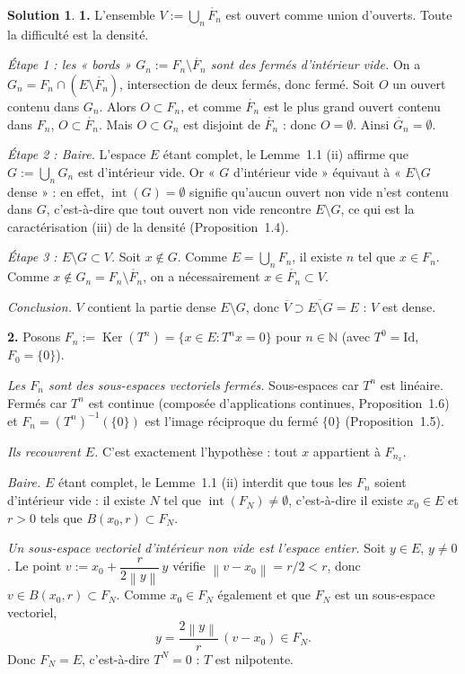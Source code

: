 \documentclass[11pt,a4paper]{article}
\newcommand{\N}{\mathbb{N}}
\newcommand{\interieur}[1]{\mathring{#1}}
\newcommand{\adh}[1]{\overline{#1}}
\newcommand{\Int}{\operatorname{int}}
\newcommand{\norm}[1]{\left\|#1\right\|}
\DeclareMathOperator{\Ker}{Ker}
\newcommand{\ie}{c'est-à-dire}
\theoremstyle{definition}
\newtheorem*{solution}{Solution}
\begin{document}
\begin{solution}
\noindent\textbf{1.} L'ensemble $V:=\bigcup_n\interieur{F_n}$ est ouvert comme union d'ouverts. Toute la difficulté est la densité.

\emph{Étape 1 : les « bords » $G_n:=F_n\setminus\interieur{F_n}$ sont des fermés d'intérieur vide.} On a $G_n=F_n\cap(E\setminus\interieur{F_n})$, intersection de deux fermés, donc fermé. Soit $O$ un ouvert contenu dans $G_n$. Alors $O\subset F_n$, et comme $\interieur{F_n}$ est le plus grand ouvert contenu dans $F_n$, $O\subset\interieur{F_n}$. Mais $O\subset G_n$ est disjoint de $\interieur{F_n}$ : donc $O=\emptyset$. Ainsi $\interieur{G_n}=\emptyset$.

\emph{Étape 2 : Baire.} L'espace $E$ étant complet, le Lemme~1.1 (ii) affirme que $G:=\bigcup_n G_n$ est d'intérieur vide. Or « $G$ d'intérieur vide » équivaut à « $E\setminus G$ dense » : en effet, $\Int(G)=\emptyset$ signifie qu'aucun ouvert non vide n'est contenu dans $G$, \ie{} que tout ouvert non vide rencontre $E\setminus G$, ce qui est la caractérisation (iii) de la densité (Proposition~1.4).

\emph{Étape 3 : $E\setminus G\subset V$.} Soit $x\notin G$. Comme $E=\bigcup_n F_n$, il existe $n$ tel que $x\in F_n$. Comme $x\notin G_n=F_n\setminus\interieur{F_n}$, on a nécessairement $x\in\interieur{F_n}\subset V$.

\emph{Conclusion.} $V$ contient la partie dense $E\setminus G$, donc $\adh{V}\supset\adh{E\setminus G}=E$ : $V$ est dense.

\bigskip
\noindent\textbf{2.} Posons $F_n:=\Ker(T^n)=\{x\in E : T^nx=0\}$ pour $n\in\N$ (avec $T^0=\mathrm{Id}$, $F_0=\{0\}$).

\emph{Les $F_n$ sont des sous-espaces vectoriels fermés.} Sous-espaces car $T^n$ est linéaire. Fermés car $T^n$ est continue (composée d'applications continues, Proposition~1.6) et $F_n=(T^n)^{-1}(\{0\})$ est l'image réciproque du fermé $\{0\}$ (Proposition~1.5).

\emph{Ils recouvrent $E$.} C'est exactement l'hypothèse : tout $x$ appartient à $F_{n_x}$.

\emph{Baire.} $E$ étant complet, le Lemme~1.1 (ii) interdit que tous les $F_n$ soient d'intérieur vide : il existe $N$ tel que $\Int(F_N)\ne\emptyset$, \ie{} il existe $x_0\in E$ et $r>0$ tels que $B(x_0,r)\subset F_N$.

\emph{Un sous-espace vectoriel d'intérieur non vide est l'espace entier.} Soit $y\in E$, $y\ne0$. Le point $v:=x_0+\dfrac{r}{2\norm{y}}\,y$ vérifie $\norm{v-x_0}=r/2<r$, donc $v\in B(x_0,r)\subset F_N$. Comme $x_0\in F_N$ également et que $F_N$ est un sous-espace vectoriel,
\[
y=\frac{2\norm{y}}{r}\,(v-x_0)\in F_N .
\]
Donc $F_N=E$, \ie{} $T^N=0$ : $T$ est nilpotente.
\end{solution}
\end{document}
